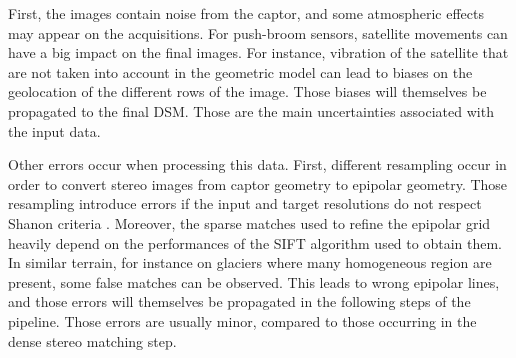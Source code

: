 First, the images contain noise from the captor, and some atmospheric effects may appear on the acquisitions. For push-broom sensors, satellite movements can have a big impact on the final images. For instance, vibration of the satellite that are not taken into account in the geometric model can lead to biases on the geolocation of the different rows of the image. Those biases will themselves be propagated to the final DSM. Those are the main uncertainties associated with the input data.

Other errors occur when processing this data. First, different resampling occur in order to convert stereo images from captor geometry to epipolar geometry. Those resampling introduce errors if the input and target resolutions do not respect Shanon criteria \cite{delon_small_2007} . Moreover, the sparse matches used to refine the epipolar grid heavily depend on the performances of the SIFT algorithm used to obtain them. In similar terrain, for instance on glaciers where many homogeneous region are present, some false matches can be observed. This leads to wrong epipolar lines, and those errors will themselves be propagated in the following steps of the pipeline. Those errors are usually minor, compared to those occurring in the dense stereo matching step.

